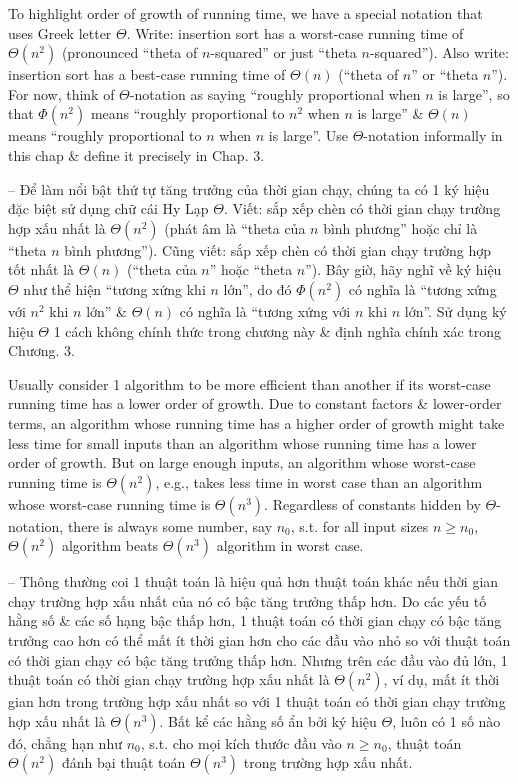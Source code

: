 \documentclass{article}
\begin{document}
\begin{itemize}
\begin{itemize}
\begin{itemize}
            To highlight order of growth of running time, we have a special notation that uses Greek letter $\Theta$. Write: insertion sort has a worst-case running time of $\Theta(n^2)$ (pronounced ``theta of $n$-squared'' or just ``theta $n$-squared''). Also write: insertion sort has a best-case running time of $\Theta(n)$ (``theta of $n$'' or ``theta $n$''). For now, think of $\Theta$-notation as saying ``roughly proportional when $n$ is large'', so that $\Phi(n^2)$ means ``roughly proportional to $n^2$ when $n$ is large'' \& $\Theta(n)$ means ``roughly proportional to $n$ when $n$ is large''. Use $\Theta$-notation informally in this chap \& define it precisely in Chap. 3.
            
            -- Để làm nổi bật thứ tự tăng trưởng của thời gian chạy, chúng ta có 1 ký hiệu đặc biệt sử dụng chữ cái Hy Lạp $\Theta$. Viết: sắp xếp chèn có thời gian chạy trường hợp xấu nhất là $\Theta(n^2)$ (phát âm là ``theta của $n$ bình phương'' hoặc chỉ là ``theta $n$ bình phương''). Cũng viết: sắp xếp chèn có thời gian chạy trường hợp tốt nhất là $\Theta(n)$ (``theta của $n$'' hoặc ``theta $n$''). Bây giờ, hãy nghĩ về ký hiệu $\Theta$ như thể hiện ``tương xứng khi $n$ lớn'', do đó $\Phi(n^2)$ có nghĩa là ``tương xứng với $n^2$ khi $n$ lớn'' \& $\Theta(n)$ có nghĩa là ``tương xứng với $n$ khi $n$ lớn''. Sử dụng ký hiệu $\Theta$ 1 cách không chính thức trong chương này \& định nghĩa chính xác trong Chương. 3.
            
            Usually consider 1 algorithm to be more efficient than another if its worst-case running time has a lower order of growth. Due to constant factors \& lower-order terms, an algorithm whose running time has a higher order of growth might take less time for small inputs than an algorithm whose running time has a lower order of growth. But on large enough inputs, an algorithm whose worst-case running time is $\Theta(n^2)$, e.g., takes less time in worst case than an algorithm whose worst-case running time is $\Theta(n^3)$. Regardless of constants hidden by $\Theta$-notation, there is always some number, say $n_0$, s.t. for all input sizes $n\ge n_0$, $\Theta(n^2)$ algorithm beats $\Theta(n^3)$ algorithm in worst case.
            
            -- Thông thường coi 1 thuật toán là hiệu quả hơn thuật toán khác nếu thời gian chạy trường hợp xấu nhất của nó có bậc tăng trưởng thấp hơn. Do các yếu tố hằng số \& các số hạng bậc thấp hơn, 1 thuật toán có thời gian chạy có bậc tăng trưởng cao hơn có thể mất ít thời gian hơn cho các đầu vào nhỏ so với thuật toán có thời gian chạy có bậc tăng trưởng thấp hơn. Nhưng trên các đầu vào đủ lớn, 1 thuật toán có thời gian chạy trường hợp xấu nhất là $\Theta(n^2)$, ví dụ, mất ít thời gian hơn trong trường hợp xấu nhất so với 1 thuật toán có thời gian chạy trường hợp xấu nhất là $\Theta(n^3)$. Bất kể các hằng số ẩn bởi ký hiệu $\Theta$, luôn có 1 số nào đó, chẳng hạn như $n_0$, s.t. cho mọi kích thước đầu vào $n\ge n_0$, thuật toán $\Theta(n^2)$ đánh bại thuật toán $\Theta(n^3)$ trong trường hợp xấu nhất.
            

\end{itemize}
\end{itemize}
\end{itemize}
\end{document}
